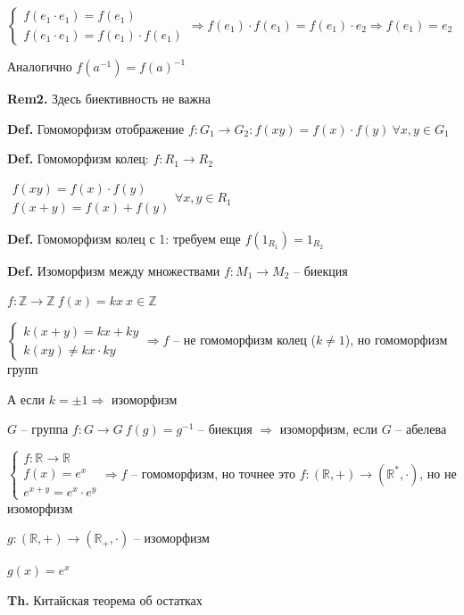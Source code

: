 \documentclass[14pt, letter paper]{article}
\begin{document}
$\begin{cases}
    f(e_1 \cdot e_1) = f(e_1) \\
    f(e_1 \cdot e_1) = f(e_1) \cdot f(e_1)
\end{cases} \Rightarrow f(e_1) \cdot f(e_1) = f(e_1) \cdot e_2 \Rightarrow f(e_1) = e_2$

Аналогично $f(a^{-1}) = f(a)^{-1}$

\textbf{Rem2.} Здесь биективность не важна

\textbf{Def.} Гомоморфизм отображение $f : G_1 \rightarrow G_2 : f(xy) = f(x) \cdot f(y)\ \forall x, y \in G_1$

\textbf{Def.} Гомоморфизм колец: $f: R_1 \rightarrow R_2$

$\begin{gathered}
    f(xy) = f(x) \cdot f(y) \\
    f(x + y) = f(x) + f(y)
\end{gathered} \forall x, y \in R_1$

\textbf{Def.} Гомоморфизм колец с 1: требуем еще $f(1_{R_1}) = 1_{R_2}$

\textbf{Def.} Изоморфизм между множествами $f: M_1 \rightarrow M_2$ -- биекция

$f : \mathbb{Z} \rightarrow \mathbb{Z}\ f(x) = kx\ x \in \mathbb{Z}$

$\begin{cases}
    k(x+y) = kx + ky \\
    k(xy) \neq kx \cdot ky
\end{cases} \Rightarrow f$ -- не гомоморфизм колец ($k \neq 1$), но гомоморфизм групп

А если $k = \pm 1 \Rightarrow$ изоморфизм

$G$ -- группа $f: G \rightarrow G\ f(g) = g^{-1}$ -- биекция $\Rightarrow$ изоморфизм, если $G$ -- абелева

$\begin{cases}
    f: \mathbb{R} \rightarrow \mathbb{R} \\
    f(x) = e^x \\
    e^{x+y} = e^x \cdot e^y
\end{cases} \Rightarrow f$ -- гомоморфизм, но точнее это $f : (\mathbb{R}, +) \rightarrow (\mathbb{R}^*, \cdot)$, но не изоморфизм

$g: (\mathbb{R}, +) \rightarrow (\mathbb{R}_+, \cdot)$ -- изоморфизм

$g(x) = e^x$

\textbf{Th.} Китайская теорема об остатках
\end{document}
